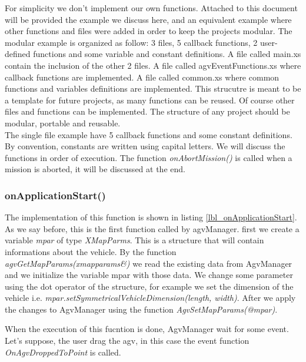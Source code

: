 For simplicity we don't implement our own functions. Attached to this document will be provided the example we discuss here, and an equivalent example where other functions and files were added in order to keep the projects modular.
The modular example is organized as follow: 3 files, 5 callback functions, 2 user-defined functions and some variable and constant definitions.
A file called main.xs contain the inclusion of the other 2 files. A file called agvEventFunctions.xs where callback functions are implemented.
A file called common.xs where common functions and variables definitions are implemented. This strucutre is meant to be a template for future projects, as many functions can be reused. Of course other files and functions can be implemented. The structure of any project should be modular, portable and reusable.\\

The single file example have 5 callback functions and some constant definitions. By convention, constants are written using capital letters.
We will discuss the functions in order of execution. The function \textit{onAbortMission()} is called when a mission is aborted, it will be discussed at the end.

\subsubsection{onApplicationStart()}
The implementation of this function is shown in listing \ref{lbl_onApplicationStart}. As we say before, this is the first function called by agvManager.
first we create a variable \textit{mpar} of type \textit{XMapParms}. This is a structure that will contain informations about the vehicle.
By the function \textit{agvGetMapParams(xmapparams\&)} we read the existing data from AgvManager and we initialize the variable mpar with those data.
We change some parameter using the dot operator of the structure, for example we set the dimension of the vehicle i.e. \textit{mpar.setSymmetricalVehicleDimension(length, width)}. After we apply the changes to AgvManager using the function \textit{AgvSetMapParams(@mpar)}.

When the execution of this fucntion is done, AgvManager wait for some event. Let's suppose, the user drag the agv, in this case the event function \textit{OnAgvDroppedToPoint} is called.




